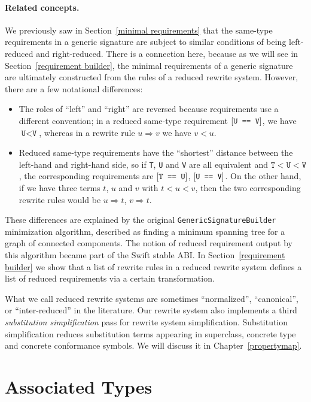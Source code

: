 \documentclass[../generics]{subfiles}
\begin{document}
\paragraph{Related concepts.}
We previously saw in Section~\ref{minimal requirements} that the same-type requirements in a generic signature are subject to similar conditions of being left-reduced and right-reduced. There is a connection here, because as we will see in Section~\ref{requirement builder}, the minimal requirements of a generic signature are ultimately constructed from the rules of a reduced rewrite system. However, there are a few notational differences:
\begin{itemize}
\item The roles of ``left'' and ``right'' are reversed because requirements use a different convention; in a reduced same-type requirement $[\texttt{U == V}]$, we have $\texttt{U} < \texttt{V}$, whereas in a rewrite rule $u\Rightarrow v$ we have $v<u$.
\item Reduced same-type requirements have the ``shortest'' distance between the left-hand and right-hand side, so if \texttt{T}, \texttt{U} and \texttt{V} are all equivalent and $\texttt{T}<\texttt{U}<\texttt{V}$, the corresponding requirements are $[\texttt{T == U}]$, $[\texttt{U == V}]$. On the other hand, if we have three terms $t$, $u$ and $v$ with $t<u<v$, then the two corresponding rewrite rules would be $u\Rightarrow t$, $v\Rightarrow t$.
\end{itemize}
These differences are explained by the original \texttt{GenericSignatureBuilder} minimization algorithm, described as finding a minimum spanning tree for a graph of connected components. The notion of reduced requirement output by this algorithm became part of the Swift stable ABI. In Section~\ref{requirement builder} we show that a list of rewrite rules in a reduced rewrite system defines a list of reduced requirements via a certain transformation.
 
What we call reduced rewrite systems are sometimes ``normalized'', ``canonical'', or ``inter-reduced'' in the literature. Our rewrite system also implements a third \emph{substitution simplification} pass for rewrite system simplification. Substitution simplification reduces substitution terms appearing in superclass, concrete type and concrete conformance symbols. We will discuss it in Chapter~\ref{propertymap}.

\section{Associated Types}\label{critical pairs}
\end{document}
